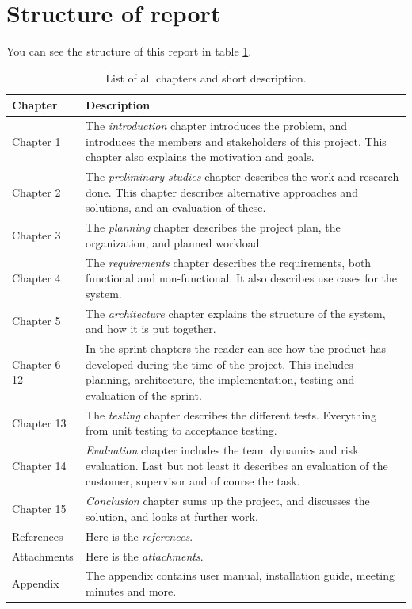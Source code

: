 \section{Structure of report}
You can see the structure of this report in table \ref{tab:structure_of_report}.
\begin{table}[!ht]\centering
\caption{List of all chapters and short description. }
\label{tab:structure_of_report}
\def\arraystretch{1.3}
\begin{tabularx}{\textwidth}{lX} \toprule[1mm]
\textbf{Chapter} & \textbf{Description} \\ \midrule
Chapter 1 & The \emph{introduction} chapter introduces the problem, and introduces the members and stakeholders of this project.
This chapter also explains the motivation and goals. \\

Chapter 2 &  The \emph{preliminary studies} chapter describes the work and research done. This chapter describes alternative approaches and solutions, and an evaluation of these. \\

Chapter 3 &  The \emph{planning} chapter describes the project plan, the organization, and planned workload.  \\

Chapter 4 &  The \emph{requirements} chapter describes the requirements, both functional and non-functional. It also describes use cases for the system. \\

Chapter 5	 &  The \emph{architecture} chapter explains the structure of the system, and how it is put together. \\

Chapter 6--12 	&  In the sprint chapters the reader can see how the product has developed during the time of the project. This includes planning, architecture, the implementation, testing and evaluation of the sprint. \\

Chapter 13 	 &  The \emph{testing} chapter describes the different tests. Everything from unit testing to acceptance testing. \\

Chapter 14 	 &  \emph{Evaluation} chapter includes the team dynamics and risk evaluation. Last but not least it describes an evaluation of the customer, supervisor and of course the task. \\

Chapter 15 	 &  \emph{Conclusion} chapter sums up the project, and discusses the solution, and looks at further work. \\

References 	 &  Here is the \emph{references}. \\

Attachments &  Here is the \emph{attachments}. \\
\midrule
Appendix 	 &   The appendix contains user manual, installation guide, meeting minutes and more.\\

\bottomrule[1mm]
\end{tabularx}
\end{table}

